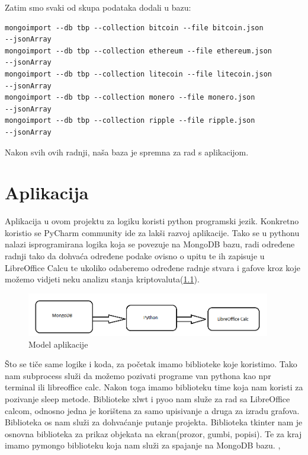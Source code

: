\documentclass[a4paper,12pt]{foi}
\begin{document}
Zatim smo svaki od skupa podataka dodali u bazu:
\lstset{commentstyle=\textit,language=python}
\begin{lstlisting}[frame=tb]
mongoimport --db tbp --collection bitcoin --file bitcoin.json 
--jsonArray
mongoimport --db tbp --collection ethereum --file ethereum.json 
--jsonArray
mongoimport --db tbp --collection litecoin --file litecoin.json 
--jsonArray
mongoimport --db tbp --collection monero --file monero.json 
--jsonArray
mongoimport --db tbp --collection ripple --file ripple.json 
--jsonArray
\end{lstlisting}

Nakon svih ovih radnji, naša baza je spremna za rad s aplikacijom.


\chapter{Aplikacija}
Aplikacija u ovom projektu za logiku koristi python programski jezik. Konkretno koristio se PyCharm community ide za lakši razvoj aplikacije. Tako se u pythonu nalazi isprogramirana logika koja se povezuje na MongoDB bazu, radi određene radnji tako da dohvaća određene podake ovisno o upitu te ih zapisuje u LibreOffice Calcu te ukoliko odaberemo određene radnje stvara i gafove kroz koje možemo vidjeti neku analizu stanja kriptovaluta(\ref{slika-3}).


\begin{figure}[h]
\centering 
\includegraphics[width=0.95\textwidth]{dizajn.png}
\caption{Model aplikacije}
\label{slika-3}
\end{figure}


Što se tiče same logike i koda, za početak imamo biblioteke koje koristimo. Tako nam subprocess služi da možemo pozivati programe van pythona kao npr terminal ili libreoffice calc. Nakon toga imamo biblioteku time koja nam koristi za pozivanje sleep metode. Biblioteke xlwt i pyoo nam služe za rad sa LibreOffice calcom, odnosno jedna je korištena za samo upisivanje a druga za izradu grafova. Biblioteka os nam služi za dohvaćanje putanje projekta. Biblioteka tkinter nam je osnovna biblioteka za prikaz objekata na ekran(prozor, gumbi, popisi). Te za kraj imamo pymongo biblioteku koja nam služi za spajanje na MongoDB bazu. \citep{pyoo}, \citep{xlwt}
\end{document}
